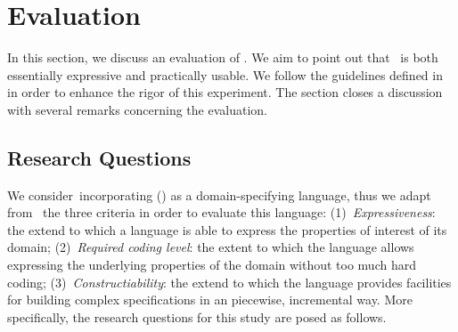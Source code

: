 \section{Evaluation}
\label{sect:evaluation} 


In this section, we discuss an evaluation of \agl. We aim to point out that \agl~is both essentially expressive and practically usable. We follow the guidelines defined in~\cite{runeson2009guidelines} in order to  enhance the rigor of this experiment. The section closes a discussion with several remarks concerning the evaluation.

\subsection{Research Questions}
\label{subsect:researchQuestions} 

%

We consider~\agl incorporating \dcsl (\agldcsl) as a domain-specifying language, thus we adapt from \cite{thakur2019role}~the three criteria in order to evaluate this language: (1)~\textit{Expressiveness}: the extend to which a language is able to express the properties of interest of its domain; (2)~\textit{Required coding level}: the extent to which the language allows expressing the underlying properties of the domain without too much hard coding; (3)~\textit{Constructiability}: the extend to which the language provides facilities for building complex specifications in an piecewise, incremental way. More specifically, the research questions for this study are posed as follows.

